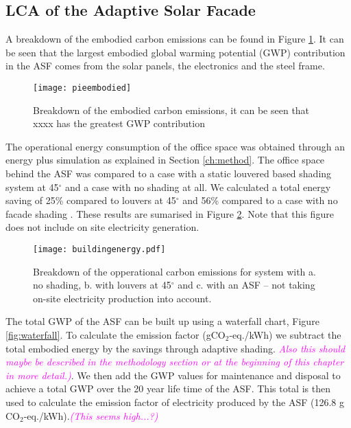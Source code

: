 
\subsection{LCA of the Adaptive Solar Facade}

A breakdown of the embodied carbon emissions can be found in Figure  \ref{fig:embodied}. It can be seen that the largest embodied global warming potential (GWP) contribution in the ASF comes from the solar panels, the electronics and the steel frame. 

\begin{figure}[H]
\begin{center}
\texttt{[image: pieembodied]}
\caption{Breakdown of the embodied carbon emissions, it can be seen that xxxx has the greatest GWP contribution}
\label{fig:embodied}
\end{center}
\end{figure}


The operational energy consumption of the office space was obtained through an energy plus simulation as explained in Section \ref{ch:method}. The office space behind the ASF was compared to a case with a static louvered based shading system at 45$^\circ$ and a case with no shading at all. We calculated a total energy saving of 25\% compared to louvers at 45$^\circ$ and 56\% compared to a case with no facade shading \cite{jayathissa2015abs}. These results are sumarised in Figure \ref{fig:operational}. Note that this figure does not include on site electricity generation. 


\begin{figure}[H]
\begin{center}
\texttt{[image: buildingenergy.pdf]}
\caption{Breakdown of the opperational carbon emissions for system with a. no shading, b. with louvers at 45$^\circ$ and c. with an ASF -- not taking on-site electricity production into account. }
\label{fig:operational}
\end{center}
\end{figure}

The total GWP of the ASF can be built up using a waterfall chart, Figure \ref{fig:waterfall}. To calculate the emission factor (gCO$_2$-eq./kWh) we subtract the total embodied energy by the savings through adaptive shading. \textcolor{magenta}{\textit{Also this should maybe be described in the methodology section or at the beginning of this chapter in more detail.)}}. We then add the GWP values for maintenance and disposal to achieve a total GWP over the 20 year life time of the ASF. This total is then used to calculate the emission factor of electricity produced by the ASF (126.8 g CO$_2$-eq./kWh).\textcolor{magenta}{\textit{(This seems high...?)}}\\

